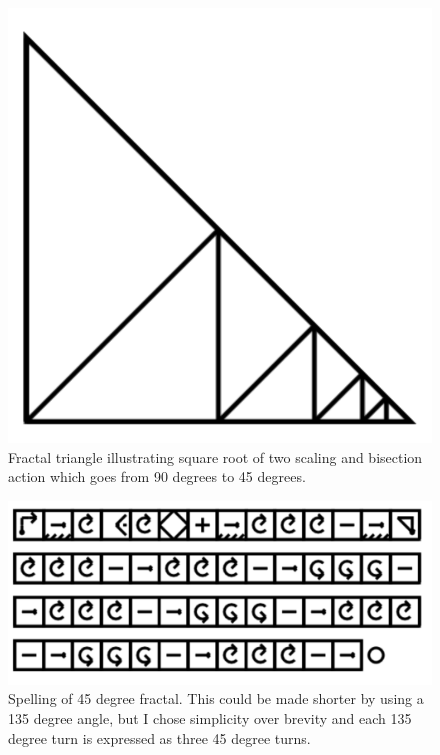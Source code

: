 \documentclass[11pt]{book}
\begin{document}
\begin{figure}

\includegraphics[width=\linewidth]{../figures/root2triangle1.png}

\caption{Fractal triangle illustrating square root of two scaling and bisection action which goes from 90 degrees to 45 degrees. }
\end{figure}


\begin{figure}

\includegraphics[width=\linewidth]{../figures/spelltriangle45.png}

\caption{Spelling of 45 degree fractal.  This could be made shorter by using a 135 degree angle, but I chose simplicity over brevity and each 135 degree turn is expressed as three 45 degree turns.}
\end{figure}
\end{document}
